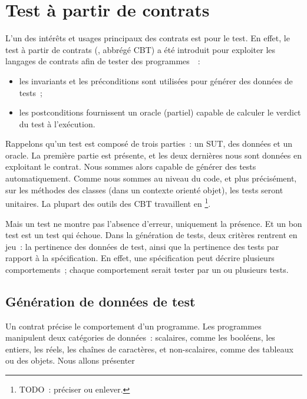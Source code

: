 \section{Test à partir de contrats}
\label{section:sota:cbt}

L'un des intérêts et usages principaux des contrats est pour le test. En effet,
le {\strong test à partir de contrats} (,
abbrégé CBT) a été introduit pour exploiter les langages
de contrats afin de tester des programmes~~:

\begin{itemize}

\item les invariants et les préconditions sont utilisées pour générer des
données de tests~;

\item les postconditions fournissent un oracle (partiel) capable de calculer le
verdict du test à l'exécution.

\end{itemize}

Rappelons qu'un test est composé de trois parties~: un SUT, des données et un
oracle. La première partie est présente, et les deux dernières nous sont données
en exploitant le contrat. Nous sommes alors capable de générer des tests
automatiquement. Comme nous sommes au niveau du code, et plus précisément, sur
les méthodes des classes (dans un contexte orienté objet), les tests seront
{\strong unitaires}. La plupart des outils des CBT travaillent en
\footnote{TODO~: préciser ou enlever.}.

Mais un test ne montre pas l'absence d'erreur, uniquement la présence. Et un bon
test est un test qui échoue. Dans la génération de tests, deux critères rentrent
en jeu~: la pertinence des données de test, ainsi que la pertinence des tests
par rapport à la spécification. En effet, une spécification peut décrire
plusieurs comportements~; chaque comportement serait tester par un ou plusieurs
tests.

\subsection{Génération de données de test}

Un contrat précise le comportement d'un programme. Les programmes manipulent
deux catégories de données~: scalaires, comme les booléens, les entiers, les
réels, les chaînes de caractères, et non-scalaires, comme des tableaux ou des
objets. Nous allons présenter 

